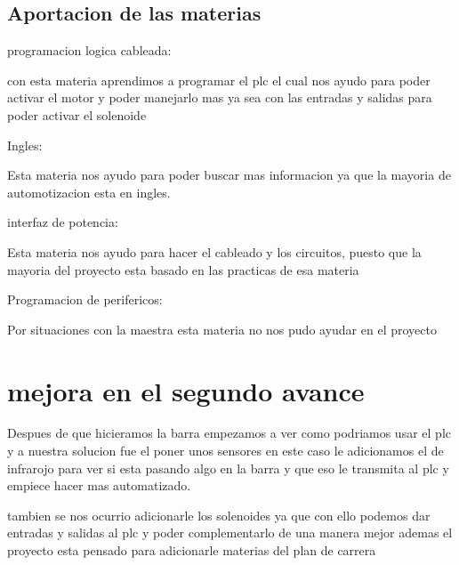 \documentclass[12pt,a4paper]{article}
\begin{document}
\subsection{Aportacion de las materias}
\begin{flushleft}
programacion logica cableada:
\end{flushleft}
\begin{center}
con esta materia aprendimos a programar el plc el cual nos ayudo  para poder activar el motor y poder manejarlo mas ya sea con las entradas y salidas para poder activar el solenoide 
\end{center}
\begin{flushleft}
Ingles:
\end{flushleft}
\begin{center}
Esta materia nos ayudo para poder buscar mas informacion ya que la mayoria de automotizacion esta en ingles.
\end{center}
\begin{flushleft}
interfaz de potencia:
\end{flushleft}
\begin{center}
Esta materia nos ayudo para hacer el cableado y los circuitos, puesto que la mayoria del proyecto esta basado en las practicas de esa materia 
\end{center}
\begin{flushleft}
Programacion de perifericos:
\end{flushleft}
\begin{center}
Por situaciones con la maestra esta materia no nos pudo ayudar en el proyecto
\end{center}
\section{mejora en el segundo avance}

\begin{flushleft}
Despues de que hicieramos la barra empezamos a ver como podriamos usar el plc y a nuestra solucion fue el poner unos sensores en este caso le adicionamos el de infrarojo para ver si esta pasando algo en la barra y que eso le transmita al plc y empiece hacer mas automatizado.
\end{flushleft}
\begin{flushleft}
tambien se nos ocurrio adicionarle los solenoides ya que con ello podemos dar entradas y salidas al plc y poder complementarlo de una manera mejor ademas el proyecto esta pensado para adicionarle materias del plan de carrera 
\end{flushleft}
\end{document}
